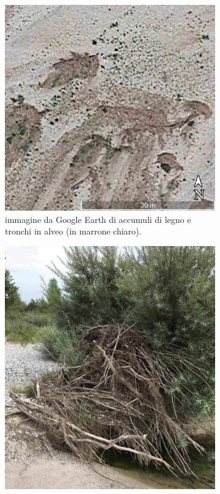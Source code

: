 \begin{figure}
	\centering
	\begin{subfigure}[b]{0.52\textwidth}
		\includegraphics[width=\textwidth]{files/esempio_accumulo_sat_1.jpg}
		\caption{immagine da Google Earth di accumuli di legno e tronchi in alveo (in marrone chiaro).}
		\label{fig:esempio-accumulo-sat-1}
	\end{subfigure}
	\quad
	\begin{subfigure}[b]{0.44\textwidth}
		\includegraphics[width=\textwidth]{files/esempio_accumulo_1.jpg}

\end{subfigure}
\end{figure}
